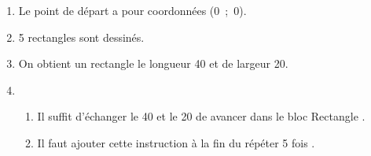 \begin{enumerate}
\item %

Le point de départ a pour coordonnées (0~;~0).
\item %
5 rectangles sont dessinés.
\item %
On obtient un rectangle le longueur 40 et de largeur 20.
\item 
	\begin{enumerate}
		\item %

Il suffit d'échanger le 40 et le 20 de \og avancer\fg{} dans le bloc \og Rectangle \fg{}.
		\item %
		
Il faut ajouter cette instruction à la fin du \og répéter 5 fois \fg.
	\end{enumerate}
\end{enumerate}